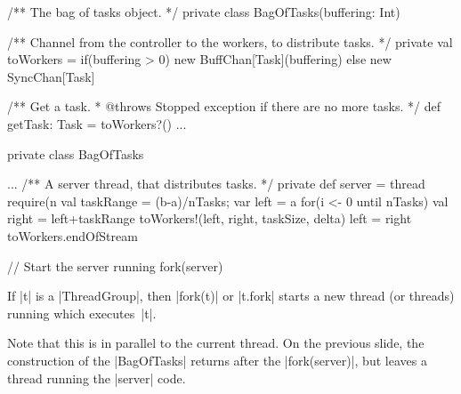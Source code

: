 
\begin{slide}

\begin{scala}
  /** The bag of tasks object. */
  private class BagOfTasks(buffering: Int){
    /** Channel from the controller to the workers, to distribute tasks. */
    private val toWorkers = 
      if(buffering > 0) new BuffChan[Task](buffering) else new SyncChan[Task]

    /** Get a task.  
      * @throws Stopped exception if there are no more tasks. */
    def getTask: Task = toWorkers?()
    ...
  }
\end{scala}
\end{slide}  


\begin{slide}

\begin{scala}
  private class BagOfTasks{
    ...
    /** A server thread, that distributes tasks. */
    private def server = thread{
      require(n%
      val taskRange = (b-a)/nTasks; var left = a                  
      for(i <- 0 until nTasks){
        val right = left+taskRange
        toWorkers!(left, right, taskSize, delta)
        left = right
      }
      toWorkers.endOfStream
    }

    // Start the server running
    fork(server)
  }
\end{scala}
\end{slide}  


\begin{slide}

If |t| is a |ThreadGroup|, then |fork(t)| or |t.fork| starts a new thread (or
threads) running which executes~|t|.

Note that this is in parallel to the current thread.  On the previous slide,
the construction of the |BagOfTasks| returns after the |fork(server)|, but
leaves a thread running the |server| code. 
\end{slide}



